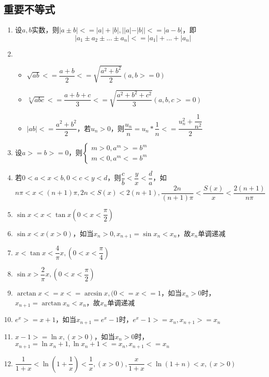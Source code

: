 \subsection{重要不等式}
\begin{enumerate}
    \item 设\(a, b\)实数，则\(|a \pm b| <= |a| + |b|, ||a| - |b|| <= |a - b|\)，即\[|a_1 \pm a_2 \pm ... \pm a_n| <= |a_1| + ... + |a_n|\]
    \item \begin{itemize}
        \item \(\sqrt{ab} <= \dfrac{a + b}{2} <= \sqrt{\dfrac{a^2 + b^2}{2}}(a, b >= 0)\)
        \item \(\sqrt[3]{abc} <= \dfrac{a + b + c}{3} <= \sqrt{\dfrac{a^2 + b^2 + c^2}{3}}(a, b, c >= 0)\)
        \item \(|ab| <= \dfrac{a^2 + b^2}{2}\)，若\(u_n > 0\)，则\(\dfrac{u_n}{n} = u_n * \dfrac{1}{n} <= \dfrac{u_n^2 + \dfrac{1}{n^2}}{2}\)
    \end{itemize}
    \item 设\(a >= b >= 0\)，则\(
    \begin{cases}
    m > 0, a^m >= b^m \\ 
    m < 0, a^m <= b^m
    \end{cases}\)
    \item 若\(0 < a < x < b, 0 < c < y < d\)，则\(\dfrac{c}{b} < \dfrac{y}{x} < \dfrac{d}{a}\)，如\(n\pi < x < (n + 1)\pi, 2n < S(x) < 2(n + 1), \dfrac{2n}{(n + 1)\pi} < \dfrac{S(x)}{x} < \dfrac{2(n + 1)}{n\pi}\)
    \item \(\sin x < x < \tan x(0 < x < \dfrac{\pi}{2})\)
    \item \(\sin x < x(x > 0)\)，如当\(x_n > 0, x_{n + 1} = \sin x_n < x_n\)，故{\(x_n\)}单调递减
    \item \(x < \tan x < \dfrac{4}{\pi}x, (0 < x < \dfrac{\pi}{4})\)
    \item \(\sin x > \dfrac{2}{\pi}x, (0 < x < \dfrac{\pi}{2})\)
    \item \(\arctan x <= x <= \arcsin x, (0 <= x <= 1\)，如当\(x_n > 0\)时，\(x_{n + 1} = \arctan x_n < x_n\)，故{\(x_n\)}单调递减
    \item \(e^x >= x + 1\)，如当\(x_{n + 1} = e^x - 1\)时，\(e^x - 1 >= x_n, x_{n + 1} >= x_n\)
    \item \(x - 1 >= \ln x, (x > 0)\)，如当\(x_n > 0\)时，\(x_{n + 1} = \ln x_n + 1, \ln x_n + 1 <= x_n, x_{n + 1} <= x_n\)
    \item \(\dfrac{1}{1 + x} < \ln(1 + \dfrac{1}{x}) < \dfrac{1}{x}, (x > 0), \dfrac{x}{1 + x} < \ln(1 + n) < x, (x > 0)\)
\end{enumerate}






